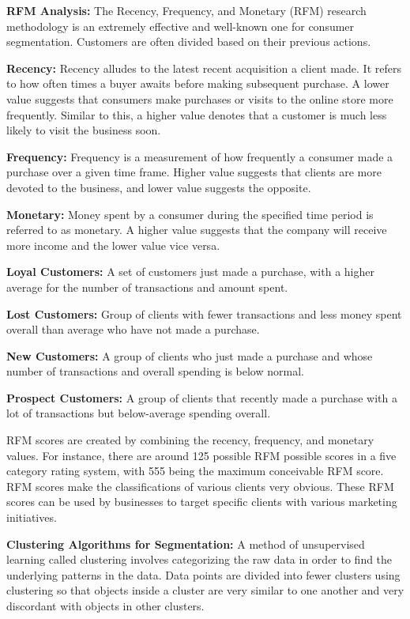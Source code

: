 \documentclass[conference]{IEEEtran}
\begin{document}
\textbf{RFM Analysis:} The Recency, Frequency, and Monetary (RFM) research methodology is an extremely effective and well-known one for consumer segmentation. Customers are often divided based on their previous actions.

\textbf{Recency:} Recency alludes to the latest recent acquisition a client made. It refers to how often times a buyer awaits before making subsequent purchase. A lower value suggests that consumers make purchases or visits to the online store more frequently. Similar to this, a higher value denotes that a customer is much less likely to visit the business soon.

\textbf{Frequency:} Frequency is a measurement of how frequently a consumer made a purchase over a given time frame. Higher value suggests that clients are more devoted to the business, and lower value suggests the opposite.

\textbf{Monetary:} Money spent by a consumer during the specified time period is referred to as monetary. A higher value suggests that the company will receive more income and the lower value vice versa.

\textbf{Loyal Customers:} A set of customers just made a purchase, with a higher average for the number of transactions and amount spent.

\textbf{Lost Customers:} Group of clients with fewer transactions and less money spent overall than average who have not made a purchase.

\textbf{New Customers:} A group of clients who just made a purchase and whose number of transactions and overall spending is below normal.

\textbf{Prospect Customers:} A group of clients that recently made a purchase with a lot of transactions but below-average spending overall.

RFM scores are created by combining the recency, frequency, and monetary values. For instance, there are around 125 possible RFM possible scores in a five category rating system, with 555 being the maximum conceivable RFM score. RFM scores make the classifications of various clients very obvious. These RFM scores can be used by businesses to target specific clients with various marketing initiatives.

\textbf{Clustering Algorithms for Segmentation:} A method of unsupervised learning called clustering involves categorizing the raw data in order to find the underlying patterns in the data. Data points are divided into fewer clusters using clustering so that objects inside a cluster are very similar to one another and very discordant with objects in other clusters.
\end{document}
